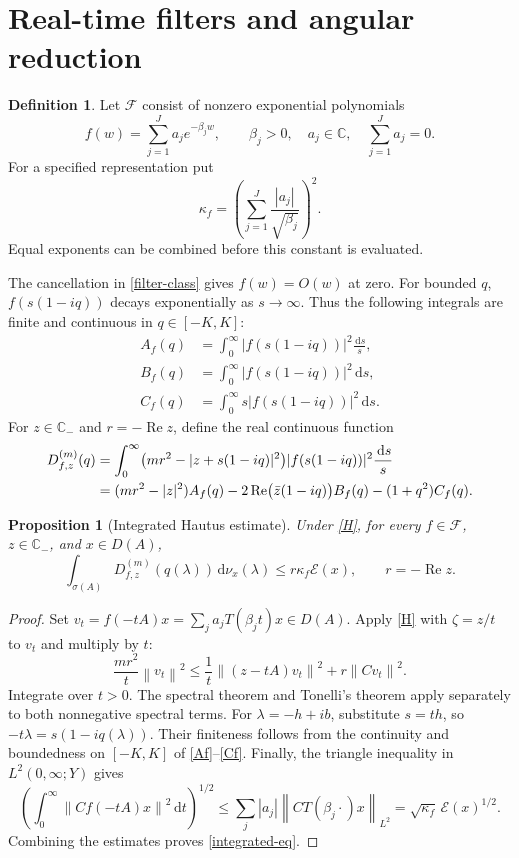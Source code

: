 \documentclass[11pt,a4paper]{article}
\newtheorem{proposition}[theorem]{Proposition}
\theoremstyle{definition}\newtheorem{definition}[theorem]{Definition}
\theoremstyle{remark}\newtheorem{remark}[theorem]{Remark}
\newcommand{\C}{\mathbb C}\newcommand{\R}{\mathbb R}\newcommand{\N}{\mathbb N}
\newcommand{\E}{\mathcal E}\newcommand{\D}{\mathcal D}
\newcommand{\F}{\mathcal F}\newcommand{\Prob}{\mathcal P}
\newcommand{\dd}{\,\mathrm d}
\DeclareMathOperator{\Rea}{Re}\DeclareMathOperator{\Ima}{Im}
\newcommand{\norm}[1]{\left\lVert #1\right\rVert}
\begin{document}
\section{Real-time filters and angular reduction}\label{sec:filters}
\begin{definition}
Let $\F$ consist of nonzero exponential polynomials
\begin{equation}\label{filter-class}
 f(w)=\sum_{j=1}^J a_j e^{-\beta_j w},\qquad
 \beta_j>0,\quad a_j\in\C,\quad\sum_{j=1}^J a_j=0.
\end{equation}
For a specified representation put
\[
 \kappa_f=\left(\sum_{j=1}^J\frac{|a_j|}{\sqrt{\beta_j}}\right)^2.
\]
Equal exponents can be combined before this constant is evaluated.
\end{definition}
The cancellation in \eqref{filter-class} gives $f(w)=O(w)$ at zero. For bounded $q$, $f(s(1-iq))$ decays exponentially as $s\to\infty$. Thus the following integrals are finite and continuous in $q\in[-K,K]$:
\begin{align}
 A_f(q)&=\int_0^\infty |f(s(1-iq))|^2\frac{\dd s}{s},\label{Af}\\
 B_f(q)&=\int_0^\infty |f(s(1-iq))|^2\dd s,\label{Bf}\\
 C_f(q)&=\int_0^\infty s|f(s(1-iq))|^2\dd s.\label{Cf}
\end{align}
For $z\in\C_-$ and $r=-\Rea z$, define the real continuous function
\begin{align}\label{Dkernel}
 D_{f,z}^{(m)}(q)
 &=\int_0^\infty\bigl(mr^2-|z+s(1-iq)|^2\bigr)
 |f(s(1-iq))|^2\frac{\dd s}{s}\\
 &=(mr^2-|z|^2)A_f(q)
 -2\Rea\bigl(\bar z(1-iq)\bigr)B_f(q)
 -(1+q^2)C_f(q).\notag
\end{align}

\begin{proposition}[Integrated Hautus estimate]\label{integrated}
Under \eqref{H}, for every $f\in\F$, $z\in\C_-$, and $x\in D(A)$,
\begin{equation}\label{integrated-eq}
 \int_{\sigma(A)}D_{f,z}^{(m)}(q(\lambda))\dd\nu_x(\lambda)
 \le r\kappa_f\E(x),\qquad r=-\Rea z.
\end{equation}
\end{proposition}
\begin{proof}
Set $v_t=f(-tA)x=\sum_j a_jT(\beta_jt)x\in D(A)$. Apply \eqref{H} with $\zeta=z/t$ to $v_t$ and multiply by $t$:
\[
 \frac{mr^2}{t}\norm{v_t}^2
 \le\frac1t\norm{(z-tA)v_t}^2+r\norm{Cv_t}^2.
\]
Integrate over $t>0$. The spectral theorem and Tonelli's theorem apply separately to both nonnegative spectral terms. For $\lambda=-h+ib$, substitute $s=th$, so $-t\lambda=s(1-iq(\lambda))$. Their finiteness follows from the continuity and boundedness on $[-K,K]$ of \eqref{Af}--\eqref{Cf}. Finally, the triangle inequality in $L^2(0,\infty;Y)$ gives
\[
 \left(\int_0^\infty\norm{Cf(-tA)x}^2\dd t\right)^{1/2}
 \le\sum_j|a_j|\norm{CT(\beta_j\cdot)x}_{L^2}
 =\sqrt{\kappa_f}\,\E(x)^{1/2}.
\]
Combining the estimates proves \eqref{integrated-eq}.
\end{proof}
\end{document}
